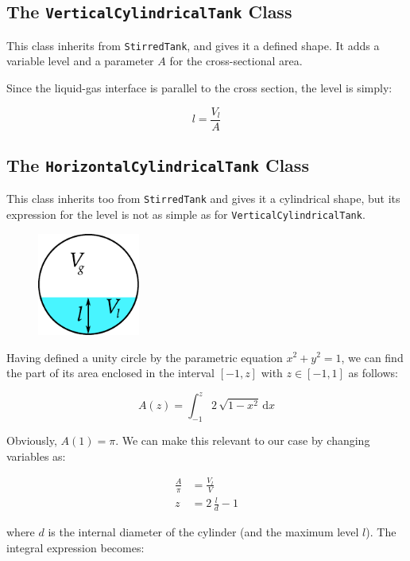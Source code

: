 \documentclass[a4paper]{article}
\renewcommand{\d}{\ensuremath{\mathrm{d}}}
\begin{document}
\subsection{The \texttt{VerticalCylindricalTank} Class}
This class inherits from \texttt{StirredTank}, and gives it a defined shape.
It adds a variable level and a parameter $A$ for the cross-sectional area.

Since the liquid-gas interface is parallel to the cross section, the level is
simply:

\begin{equation}
l = \frac{V_l}{A}
\end{equation}

\subsection{The \texttt{HorizontalCylindricalTank} Class}
This class inherits too from \texttt{StirredTank} and gives it a cylindrical
shape, but its expression for the level is not as simple as for
\texttt{VerticalCylindricalTank}.

\begin{figure}[h]
\centering
\includegraphics[width=0.3\textwidth]{pics/crosssection}
\end{figure}

Having defined a unity circle by the parametric equation $x^2+y^2=1$, we can
find the part of its area enclosed in the interval $[-1,z]$ with $z \in [-1,1]$
as follows:

\begin{equation}
A(z) = \int_{-1}^z 2 \, \sqrt{1-x^2} \, \d x
\end{equation}

Obviously, $A(1) = \pi$. We can make this relevant to our case by changing
variables as:

\begin{align}
\frac{A}{\pi} &= \frac{V_l}{V}\\
z &= 2\,\frac{l}{d}-1
\end{align}

where $d$ is the internal diameter of the cylinder (and the maximum level $l$).
The integral expression becomes:
\end{document}
